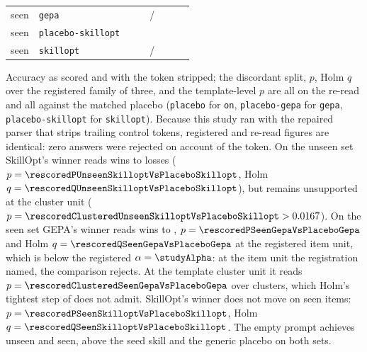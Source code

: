 \begin{center}
\begin{tabular}{llrrrrrr}
seen & \texttt{gepa} & \NUM{\accSeenGepa} & \NUM{\rescoredAccSeenGepa} & \NUM{\rescoredWinsSeenGepaVsPlaceboGepa}/\NUM{\rescoredLossesSeenGepaVsPlaceboGepa} & \NUM{\rescoredPSeenGepaVsPlaceboGepa} & \NUM{\rescoredQSeenGepaVsPlaceboGepa} & \NUM{\rescoredClusteredSeenGepaVsPlaceboGepa} \\
seen & \texttt{placebo-skillopt} & \NUM{\accSeenPlaceboSkillopt} & \NUM{\rescoredAccSeenPlaceboSkillopt} & & & & \\
seen & \texttt{skillopt} & \NUM{\accSeenSkillopt} & \NUM{\rescoredAccSeenSkillopt} & \NUM{\rescoredWinsSeenSkilloptVsPlaceboSkillopt}/\NUM{\rescoredLossesSeenSkilloptVsPlaceboSkillopt} & \NUM{\rescoredPSeenSkilloptVsPlaceboSkillopt} & \NUM{\rescoredQSeenSkilloptVsPlaceboSkillopt} & \NUM{\rescoredClusteredSeenSkilloptVsPlaceboSkillopt} \\
\bottomrule
\end{tabular}
\end{center}

Accuracy as scored and with the token stripped; the discordant split, $p$,
Holm $q$ over the registered family of three, and the template-level $p$ are
all on the re-read and all against the matched placebo (\texttt{placebo} for
\texttt{on}, \texttt{placebo-gepa} for \texttt{gepa}, \texttt{placebo-skillopt}
for \texttt{skillopt}). Because this study ran with the repaired parser that strips
trailing control tokens, registered and re-read figures are identical: zero answers
were rejected on account of the token.
On the unseen set SkillOpt's winner reads \NUM{\rescoredWinsUnseenSkilloptVsPlaceboSkillopt}
wins to \NUM{\rescoredLossesUnseenSkilloptVsPlaceboSkillopt} losses ($p = \NUM{\rescoredPUnseenSkilloptVsPlaceboSkillopt}$,
Holm $q = \NUM{\rescoredQUnseenSkilloptVsPlaceboSkillopt}$), but remains
unsupported at the cluster unit ($p = \NUM{\rescoredClusteredUnseenSkilloptVsPlaceboSkillopt} > 0.0167$).
On the seen set GEPA's winner reads
\NUM{\rescoredWinsSeenGepaVsPlaceboGepa} wins to \NUM{\rescoredLossesSeenGepaVsPlaceboGepa},
$p = \NUM{\rescoredPSeenGepaVsPlaceboGepa}$ and Holm $q = \NUM{\rescoredQSeenGepaVsPlaceboGepa}$ at
the registered item unit, which is below the registered
$\alpha = \NUM{\studyAlpha}$: at the item unit the registration named, the
comparison rejects. At the template cluster unit it reads
$p = \NUM{\rescoredClusteredSeenGepaVsPlaceboGepa}$ over \NUM{\rescoredClustersSeenGepaVsPlaceboGepa}
clusters, which Holm's tightest step of \NUM{\mdeAlpha} does not admit.
SkillOpt's winner does not move on seen items: $p = \NUM{\rescoredPSeenSkilloptVsPlaceboSkillopt}$,
Holm $q = \NUM{\rescoredQSeenSkilloptVsPlaceboSkillopt}$.
The empty prompt achieves \NUM{\rescoredAccUnseenOff} unseen and \NUM{\rescoredAccSeenOff} seen,
above the seed skill and the generic placebo on both sets.

